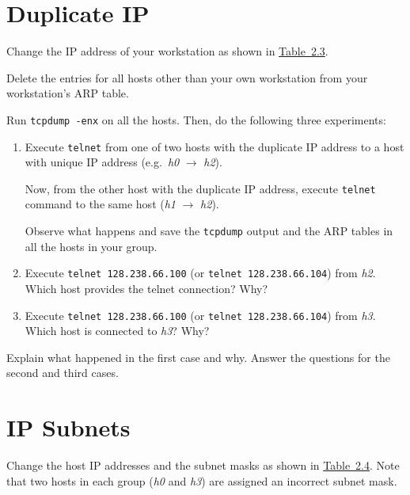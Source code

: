 \documentclass{../UTNetLab}
\begin{document}
\section{Duplicate IP}\label{sec:duplicate-ip}
    Change the IP address of your workstation as shown in \hyperref[tab:2.3]{Table~2.3}.

    Delete the entries for all hosts other than your own workstation from your workstation’s ARP table.

    Run \lstinline{tcpdump -enx} on all the hosts. Then, do the following three experiments:

    \begin{enumerate}
        \item Execute \lstinline{telnet} from one of two hosts with the duplicate IP address to a host with unique IP address (e.g.\ \textit{h0} $\rightarrow$ \textit{h2}).

        Now, from the other host with the duplicate IP address, execute \lstinline{telnet} command to the same host (\textit{h1} $\rightarrow$ \textit{h2}).

        Observe what happens and save the \lstinline{tcpdump} output and the ARP tables in all the hosts in your group.
        
        \item Execute \lstinline{telnet 128.238.66.100} (or \lstinline{telnet 128.238.66.104}) from \textit{h2}.
        Which host provides the telnet connection?
        Why?
        
        \item Execute \lstinline{telnet 128.238.66.100} (or \lstinline{telnet 128.238.66.104}) from \textit{h3}. Which host is connected to \textit{h3}? Why?
    \end{enumerate}
    
    \begin{report}
    \item Explain what happened in the first case and why.
    Answer the questions for the second and third cases.
    \end{report}

\section{IP Subnets}\label{sec:ip-subnets}
    Change the host IP addresses and the subnet masks as shown in \hyperref[tab:2.4]{Table~2.4}.
    Note that two hosts in each group (\textit{h0} and \textit{h3}) are assigned an incorrect subnet mask.
\end{document}
